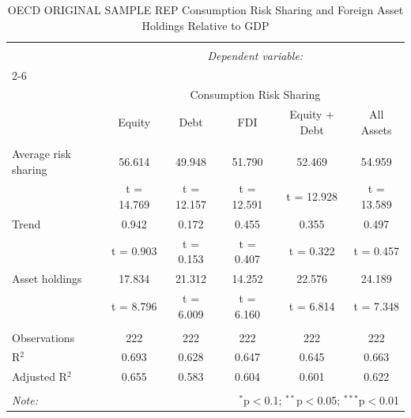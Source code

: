 
\begin{table}[!htbp] \centering 
  \caption{OECD ORIGINAL SAMPLE REP Consumption Risk Sharing and Foreign Asset Holdings Relative to GDP} 
  \label{} 
\begin{tabular}{@{\extracolsep{5pt}}lccccc} 
\\[-1.8ex]\hline 
\hline \\[-1.8ex] 
 & \multicolumn{5}{c}{\textit{Dependent variable:}} \\ 
\cline{2-6} 
\\[-1.8ex] & \multicolumn{5}{c}{Consumption Risk Sharing} \\ 
 & Equity & Debt & FDI & Equity + Debt & All Assets \\ 
\hline \\[-1.8ex] 
 Average risk sharing & 56.614 & 49.948 & 51.790 & 52.469 & 54.959 \\ 
  & t = 14.769 & t = 12.157 & t = 12.591 & t = 12.928 & t = 13.589 \\ 
  Trend & 0.942 & 0.172 & 0.455 & 0.355 & 0.497 \\ 
  & t = 0.903 & t = 0.153 & t = 0.407 & t = 0.322 & t = 0.457 \\ 
  Asset holdings & 17.834 & 21.312 & 14.252 & 22.576 & 24.189 \\ 
  & t = 8.796 & t = 6.009 & t = 6.160 & t = 6.814 & t = 7.348 \\ 
 \hline \\[-1.8ex] 
Observations & 222 & 222 & 222 & 222 & 222 \\ 
R$^{2}$ & 0.693 & 0.628 & 0.647 & 0.645 & 0.663 \\ 
Adjusted R$^{2}$ & 0.655 & 0.583 & 0.604 & 0.601 & 0.622 \\ 
\hline 
\hline \\[-1.8ex] 
\textit{Note:}  & \multicolumn{5}{r}{$^{*}$p$<$0.1; $^{**}$p$<$0.05; $^{***}$p$<$0.01} \\ 
\end{tabular} 
\end{table} 

